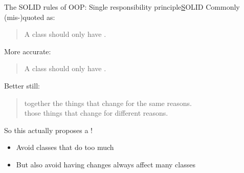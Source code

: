 \begin{frame}{The SOLID rules of OOP: Single responsibility principle}{\underline SOLID}
	Commonly (mis-)quoted as:
	
	\begin{quote}
		A class should only have .
	\end{quote}

	\medskip
	More accurate:
	
	\begin{quote}
		A class should only have .
	\end{quote}

	\medskip
	Better still:
	\begin{quote}
		 together the things that change for the same reasons. \\
		 those things that change for different reasons.
	\end{quote}

	\medskip
	So this actually proposes a !
	\begin{itemize}
		\item Avoid classes that do too much 
		\item But also avoid having changes always affect many classes 
	\end{itemize}
\end{frame}

